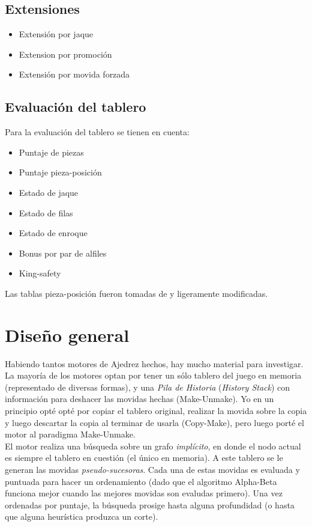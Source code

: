 \documentclass{article}
\begin{document}
\subsection{Extensiones}
\begin{itemize}
\item Extensión por jaque
\item Extension por promoción
\item Extensión por movida forzada
\end{itemize}

\subsection{Evaluación del tablero}
Para la evaluación del tablero se tienen en cuenta:
\begin{itemize}
\item Puntaje de piezas
\item Puntaje pieza-posición
\item Estado de jaque
\item Estado de filas
\item Estado de enroque
\item Bonus por par de alfiles
\item King-safety
\end{itemize}

Las tablas pieza-posición fueron tomadas de \cite{piece-square-table} y
ligeramente modificadas.\\

\section{Diseño general}

Habiendo tantos motores de Ajedrez hechos, hay mucho material para
investigar. La mayoría de los motores optan por tener un sólo tablero
del juego en memoria (representado de diversas formas), y una \emph
{Pila de Historia} (\emph {History Stack}) con información para
deshacer las movidas hechas (Make-Unmake). Yo en un principio opté
opté por copiar el tablero original, realizar la movida sobre la copia
y luego descartar la copia al terminar de usarla (Copy-Make), pero luego
porté el motor al paradigma Make-Unmake.
\\

El motor realiza una búsqueda sobre un grafo \emph{implícito},
en donde el nodo actual es siempre el tablero en cuestión (el
único en memoria). A este tablero se le generan las movidas
\emph{pseudo-sucesoras}. Cada una de estas movidas es evaluada y
puntuada para hacer un ordenamiento (dado que el algoritmo Alpha-Beta
funciona mejor cuando las mejores movidas son evaludas primero). Una vez
ordenadas por puntaje, la búsqueda prosige hasta alguna profundidad (o
hasta que alguna heurística produzca un corte).
\\
\end{document}
